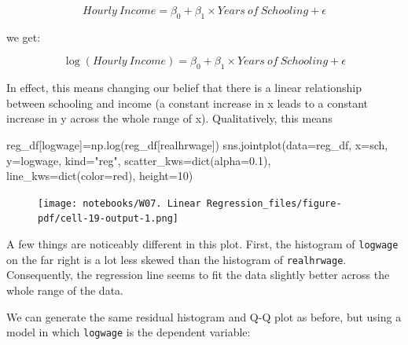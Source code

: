 \documentclass[
  letterpaper,
  DIV=11,
  numbers=noendperiod]{scrreprt}
\newenvironment{Shaded}{\begin{snugshade}}{\end{snugshade}}
\newcommand{\BuiltInTok}[1]{\textcolor[rgb]{0.00,0.23,0.31}{#1}}
\newcommand{\DecValTok}[1]{\textcolor[rgb]{0.68,0.00,0.00}{#1}}
\newcommand{\FloatTok}[1]{\textcolor[rgb]{0.68,0.00,0.00}{#1}}
\newcommand{\NormalTok}[1]{\textcolor[rgb]{0.00,0.23,0.31}{#1}}
\newcommand{\OperatorTok}[1]{\textcolor[rgb]{0.37,0.37,0.37}{#1}}
\newcommand{\StringTok}[1]{\textcolor[rgb]{0.13,0.47,0.30}{#1}}
\begin{document}
\[Hourly\ Income= \beta_0 + \beta_1 \times Years\ of\ Schooling +\epsilon \]

we get:

\[\log{(Hourly\ Income)}= \beta_0 + \beta_1 \times Years\ of\ Schooling +\epsilon \]

In effect, this means changing our belief that there is a linear
relationship between schooling and income (a constant increase in x
leads to a constant increase in y across the whole range of x).
Qualitatively, this means

\begin{Shaded}
\begin{Highlighting}[]
\NormalTok{reg\_df[}\StringTok{\textquotesingle{}logwage\textquotesingle{}}\NormalTok{]}\OperatorTok{=}\NormalTok{np.log(reg\_df[}\StringTok{\textquotesingle{}realhrwage\textquotesingle{}}\NormalTok{])}
\NormalTok{sns.jointplot(data}\OperatorTok{=}\NormalTok{reg\_df, x}\OperatorTok{=}\StringTok{\textquotesingle{}sch\textquotesingle{}}\NormalTok{, y}\OperatorTok{=}\StringTok{\textquotesingle{}logwage\textquotesingle{}}\NormalTok{, kind}\OperatorTok{=}\StringTok{"reg"}\NormalTok{,  scatter\_kws}\OperatorTok{=}\BuiltInTok{dict}\NormalTok{(alpha}\OperatorTok{=}\FloatTok{0.1}\NormalTok{), line\_kws}\OperatorTok{=}\BuiltInTok{dict}\NormalTok{(color}\OperatorTok{=}\StringTok{\textquotesingle{}red\textquotesingle{}}\NormalTok{), height}\OperatorTok{=}\DecValTok{10}\NormalTok{)}
\end{Highlighting}
\end{Shaded}

\begin{figure}[H]

{\centering \texttt{[image: notebooks/W07. Linear Regression\_files/figure-pdf/cell-19-output-1.png]}

}

\end{figure}

A few things are noticeably different in this plot. First, the histogram
of \texttt{logwage} on the far right is a lot less skewed than the
histogram of \texttt{realhrwage}. Consequently, the regression line
seems to fit the data slightly better across the whole range of the
data.

We can generate the same residual histogram and Q-Q plot as before, but
using a model in which \texttt{logwage} is the dependent variable:
\end{document}

